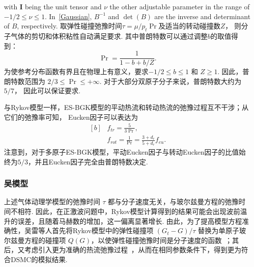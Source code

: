 	with $\bm{I} $ being the unit tensor and $ \nu $ the other adjustable parameter in the range of $ -1/2\leq \nu \le 1 $. In~\eqref{Gaussian}, $B^{-1}$ and $\det(B)$ are the inverse and determinant of $B$, respectively.
取弹性碰撞弛豫时间$\tau=\mu/p_t\Pr$及适当的转动碰撞数$Z$， 则分子气体的剪切和体积粘性自动满足要求. 
其中普朗特数可以通过调整$b$的取值得到：
\begin{equation}\label{Pr}
\Pr=\frac{1}{1-b+b/Z}.
\end{equation}
为使参考分布函数有界且在物理上有意义，要求$ -1/2\leq {b} \le 1 $ 和 $ Z\ge 1 $. 因此，普朗特数范围为 $ 2/3 \leq \Pr \le +\infty$. 对于大部分双原子分子来说，普朗特数大约为$5/7$， 因此可以保证要求. 

与Rykov模型一样，ES-BGK模型的平动热流和转动热流的弛豫过程互不干涉；从它们的弛豫率可知，
Eucken因子可以表达为
\begin{equation}\label{eq:ES_ftr_frot}
\begin{aligned}[b]
&f_{tr}=\frac{5}{3\Pr},\\
&f_{rot}=\frac{1}{\Pr}=\frac{3+d_r}{5+d_r}f_{eu}.
\end{aligned}
\end{equation}
注意到，对于多原子ES-BGK模型，平动Eucken因子与转动Eucken因子的比值始终为$ 5/3 $，并且Eucken因子完全由普朗特数决定. 



\subsubsection{吴模型}

上述气体动理学模型的弛豫时间 $ \tau $ 都与分子速度无关，与玻尔兹曼方程的弛豫时间不相符. 因此，在正激波问题中，Rykov模型计算得到的结果可能会出现波前温升的误差，且随着马赫数的增加，这一偏离显著增长. 由此，为了提高模型方程准确性，吴雷等人首先将Rykov模型中的弹性碰撞项 $ ({G_t}-G)/\tau $ 替换为单原子玻尔兹曼方程的碰撞项 $ Q(G) $，以使弹性碰撞弛豫时间是分子速度的函数~\cite{wu2015kinetic}；其后，又考虑引入更为准确的热流弛豫过程~\cite{Li2021Uncertainty}，从而在相同参数条件下，得到更为符合DSMC的模拟结果. 

